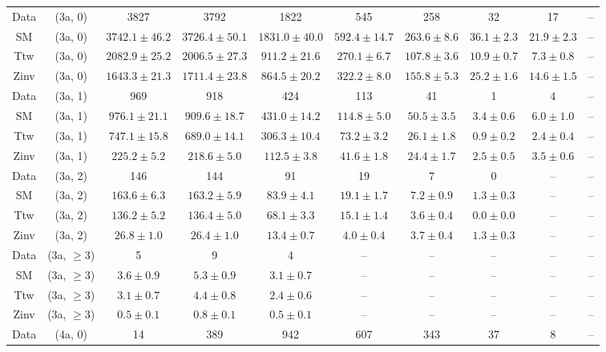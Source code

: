 \begin{table}[h!]
{\begin{tabular}{cccccccccc}
	Data & (3a, 0) & 3827 & 3792 & 1822 & 545 & 258 & 32 & 17 & -- \\[0.5ex] 
	SM & (3a, 0) & $3742.1\pm 46.2$ & $3726.4\pm 50.1$ & $1831.0\pm 40.0$ & $592.4\pm 14.7$ & $263.6\pm 8.6$ & $36.1\pm 2.3$ & $21.9\pm 2.3$ & -- \\[0.5ex] 
	Ttw & (3a, 0) & $2082.9\pm 25.2$ & $2006.5\pm 27.3$ & $911.2\pm 21.6$ & $270.1\pm 6.7$ & $107.8\pm 3.6$ & $10.9\pm 0.7$ & $7.3\pm 0.8$ & -- \\[0.5ex] 
	Zinv & (3a, 0) & $1643.3\pm 21.3$ & $1711.4\pm 23.8$ & $864.5\pm 20.2$ & $322.2\pm 8.0$ & $155.8\pm 5.3$ & $25.2\pm 1.6$ & $14.6\pm 1.5$ & -- \\[0.5ex] 
	Data & (3a, 1) & 969 & 918 & 424 & 113 & 41 & 1 & 4 & -- \\[0.5ex] 
	SM & (3a, 1) & $976.1\pm 21.1$ & $909.6\pm 18.7$ & $431.0\pm 14.2$ & $114.8\pm 5.0$ & $50.5\pm 3.5$ & $3.4\pm 0.6$ & $6.0\pm 1.0$ & -- \\[0.5ex] 
	Ttw & (3a, 1) & $747.1\pm 15.8$ & $689.0\pm 14.1$ & $306.3\pm 10.4$ & $73.2\pm 3.2$ & $26.1\pm 1.8$ & $0.9\pm 0.2$ & $2.4\pm 0.4$ & -- \\[0.5ex] 
	Zinv & (3a, 1) & $225.2\pm 5.2$ & $218.6\pm 5.0$ & $112.5\pm 3.8$ & $41.6\pm 1.8$ & $24.4\pm 1.7$ & $2.5\pm 0.5$ & $3.5\pm 0.6$ & -- \\[0.5ex] 
	Data & (3a, 2) & 146 & 144 & 91 & 19 & 7 & 0 & -- & -- \\[0.5ex] 
	SM & (3a, 2) & $163.6\pm 6.3$ & $163.2\pm 5.9$ & $83.9\pm 4.1$ & $19.1\pm 1.7$ & $7.2\pm 0.9$ & $1.3\pm 0.3$ & -- & -- \\[0.5ex] 
	Ttw & (3a, 2) & $136.2\pm 5.2$ & $136.4\pm 5.0$ & $68.1\pm 3.3$ & $15.1\pm 1.4$ & $3.6\pm 0.4$ & $0.0\pm 0.0$ & -- & -- \\[0.5ex] 
	Zinv & (3a, 2) & $26.8\pm 1.0$ & $26.4\pm 1.0$ & $13.4\pm 0.7$ & $4.0\pm 0.4$ & $3.7\pm 0.4$ & $1.3\pm 0.3$ & -- & -- \\[0.5ex] 
	Data & (3a, $\ge3$) & 5 & 9 & 4 & -- & -- & -- & -- & -- \\[0.5ex] 
	SM & (3a, $\ge3$) & $3.6\pm 0.9$ & $5.3\pm 0.9$ & $3.1\pm 0.7$ & -- & -- & -- & -- & -- \\[0.5ex] 
	Ttw & (3a, $\ge3$) & $3.1\pm 0.7$ & $4.4\pm 0.8$ & $2.4\pm 0.6$ & -- & -- & -- & -- & -- \\[0.5ex] 
	Zinv & (3a, $\ge3$) & $0.5\pm 0.1$ & $0.8\pm 0.1$ & $0.5\pm 0.1$ & -- & -- & -- & -- & -- \\[0.5ex] 
	Data & (4a, 0) & 14 & 389 & 942 & 607 & 343 & 37 & 8 & -- \\[0.5ex] 

\end{tabular}}
\end{table}
